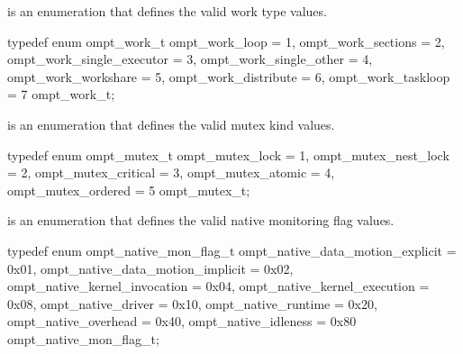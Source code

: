 
\label{sec:ompt_work_t}
 is an enumeration that defines the valid work type values.


\begin{ccppspecific}
\begin{omptEnum}
typedef enum ompt_work_t {
  ompt_work_loop               = 1,
  ompt_work_sections           = 2,
  ompt_work_single_executor    = 3,
  ompt_work_single_other       = 4,
  ompt_work_workshare          = 5,
  ompt_work_distribute         = 6,
  ompt_work_taskloop           = 7
} ompt_work_t;
\end{omptEnum}
\end{ccppspecific}





\label{sec:ompt_mutex_t}
 is an enumeration that defines the valid mutex kind values.


\begin{ccppspecific}
\begin{omptEnum}
typedef enum ompt_mutex_t {
  ompt_mutex_lock                     = 1,
  ompt_mutex_nest_lock                = 2,
  ompt_mutex_critical                 = 3,
  ompt_mutex_atomic                   = 4,
  ompt_mutex_ordered                  = 5
} ompt_mutex_t;
\end{omptEnum}
\end{ccppspecific}





\label{sec:ompt_native_mon_flag_t}
 is an enumeration that defines the valid native monitoring flag values.


\begin{ccppspecific}
\begin{omptEnum}
typedef enum ompt_native_mon_flag_t {
  ompt_native_data_motion_explicit    = 0x01,
  ompt_native_data_motion_implicit    = 0x02,
  ompt_native_kernel_invocation       = 0x04,
  ompt_native_kernel_execution        = 0x08,
  ompt_native_driver                  = 0x10,
  ompt_native_runtime                 = 0x20,
  ompt_native_overhead                = 0x40,
  ompt_native_idleness                = 0x80
} ompt_native_mon_flag_t;
\end{omptEnum}
\end{ccppspecific}




